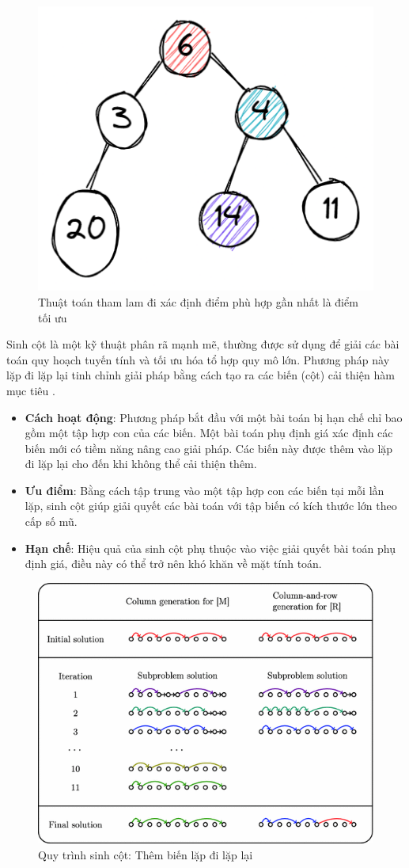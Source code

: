 \begin{figure}[!htp]
    \centering
    \includegraphics[width=0.3\linewidth]{Images/greedy.png}
    \caption{Thuật toán tham lam đi xác định điểm phù hợp gần nhất là điểm tối ưu}
    \label{fig:descGreedy}
\end{figure}


\hspace{0.5cm}Sinh cột là một kỹ thuật phân rã mạnh mẽ, thường được sử dụng để giải các bài toán quy hoạch tuyến tính và tối ưu hóa tổ hợp quy mô lớn. Phương pháp này lặp đi lặp lại tinh chỉnh giải pháp bằng cách tạo ra các biến (cột) cải thiện hàm mục tiêu \cite{lubbecke2003columngeneration}.

\begin{itemize}
    \item \textbf{Cách hoạt động}: Phương pháp bắt đầu với một bài toán bị hạn chế chỉ bao gồm một tập hợp con của các biến. Một bài toán phụ định giá xác định các biến mới có tiềm năng nâng cao giải pháp. Các biến này được thêm vào lặp đi lặp lại cho đến khi không thể cải thiện thêm.
    \item \textbf{Ưu điểm}: Bằng cách tập trung vào một tập hợp con các biến tại mỗi lần lặp, sinh cột giúp giải quyết các bài toán với tập biến có kích thước lớn theo cấp số mũ.
    \item \textbf{Hạn chế}: Hiệu quả của sinh cột phụ thuộc vào việc giải quyết bài toán phụ định giá, điều này có thể trở nên khó khăn về mặt tính toán.
\end{itemize}

\begin{figure}[!htp]
    \centering
    \includegraphics[width=0.35\linewidth]{Images/columngen.png}
    \caption{Quy trình sinh cột: Thêm biến lặp đi lặp lại}
    \label{fig:descColumnGen}
\end{figure}

